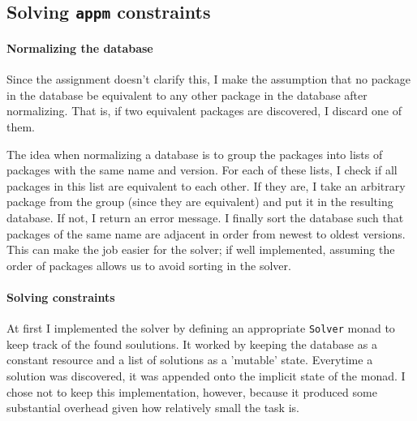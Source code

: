 \subsection*{Solving \texttt{appm} constraints}

\paragraph{Normalizing the database}
Since the assignment doesn't clarify this, I make the assumption that no package in the database be equivalent to any other package in the database after normalizing. That is, if two equivalent packages are discovered, I discard one of them.

The idea when normalizing a database is to group the packages into lists of packages with the same name and version. For each of these lists, I check if all packages in this list are equivalent to each other. If they are, I take an arbitrary package from the group (since they are equivalent) and put it in the resulting database. If not, I return an error message. I finally sort the database such that packages of the same name are adjacent in order from newest to oldest versions. This can make the job easier for the solver; if well implemented, assuming the order of packages allows us to avoid sorting in the solver.

\paragraph{Solving constraints}
At first I implemented the solver by defining an appropriate \texttt{Solver} monad to keep track of the found soulutions. It worked by keeping the database as a constant resource and a list of solutions as a 'mutable' state. Everytime a solution was discovered, it was appended onto the implicit state of the monad. I chose not to keep this implementation, however, because it produced some substantial overhead given how relatively small the task is.
%
%
%
%
%


